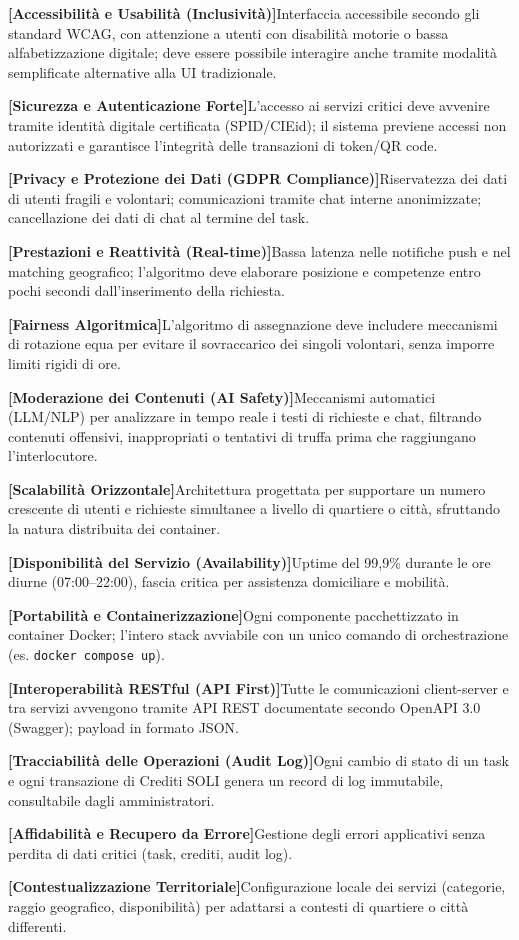 \documentclass[11pt,a4paper]{article}
\begin{document}
\newcommand{\nfr}[3]{\item[\textbf{NFR-#1}] \textbf{[#2]}\quad #3}
\begin{description}[leftmargin=1.8cm,style=nextline]
\nfr{01}{Accessibilit\`a e Usabilit\`a (Inclusivit\`a)}{Interfaccia accessibile secondo gli standard WCAG, con attenzione a utenti con disabilit\`a motorie o bassa alfabetizzazione digitale; deve essere possibile interagire anche tramite modalit\`a semplificate alternative alla UI tradizionale.}
\nfr{02}{Sicurezza e Autenticazione Forte}{L'accesso ai servizi critici deve avvenire tramite identit\`a digitale certificata (SPID/CIEid); il sistema previene accessi non autorizzati e garantisce l'integrit\`a delle transazioni di token/QR code.}
\nfr{03}{Privacy e Protezione dei Dati (GDPR Compliance)}{Riservatezza dei dati di utenti fragili e volontari; comunicazioni tramite chat interne anonimizzate; cancellazione dei dati di chat al termine del task.}
\nfr{04}{Prestazioni e Reattivit\`a (Real-time)}{Bassa latenza nelle notifiche push e nel matching geografico; l'algoritmo deve elaborare posizione e competenze entro pochi secondi dall'inserimento della richiesta.}
\nfr{05}{Fairness Algoritmica}{L'algoritmo di assegnazione deve includere meccanismi di rotazione equa per evitare il sovraccarico dei singoli volontari, senza imporre limiti rigidi di ore.}
\nfr{06}{Moderazione dei Contenuti (AI Safety)}{Meccanismi automatici (LLM/NLP) per analizzare in tempo reale i testi di richieste e chat, filtrando contenuti offensivi, inappropriati o tentativi di truffa prima che raggiungano l'interlocutore.}
\nfr{07}{Scalabilit\`a Orizzontale}{Architettura progettata per supportare un numero crescente di utenti e richieste simultanee a livello di quartiere o citt\`a, sfruttando la natura distribuita dei container.}
\nfr{08}{Disponibilit\`a del Servizio (Availability)}{Uptime del 99,9\% durante le ore diurne (07:00--22:00), fascia critica per assistenza domiciliare e mobilit\`a.}
\nfr{09}{Portabilit\`a e Containerizzazione}{Ogni componente pacchettizzato in container Docker; l'intero stack avviabile con un unico comando di orchestrazione (es. \texttt{docker compose up}).}
\nfr{10}{Interoperabilit\`a RESTful (API First)}{Tutte le comunicazioni client-server e tra servizi avvengono tramite API REST documentate secondo OpenAPI 3.0 (Swagger); payload in formato JSON.}
\nfr{11}{Tracciabilit\`a delle Operazioni (Audit Log)}{Ogni cambio di stato di un task e ogni transazione di Crediti SOLI genera un record di log immutabile, consultabile dagli amministratori.}
\nfr{12}{Affidabilit\`a e Recupero da Errore}{Gestione degli errori applicativi senza perdita di dati critici (task, crediti, audit log).}
\nfr{13}{Contestualizzazione Territoriale}{Configurazione locale dei servizi (categorie, raggio geografico, disponibilit\`a) per adattarsi a contesti di quartiere o citt\`a differenti.}
\end{description}
\end{document}
